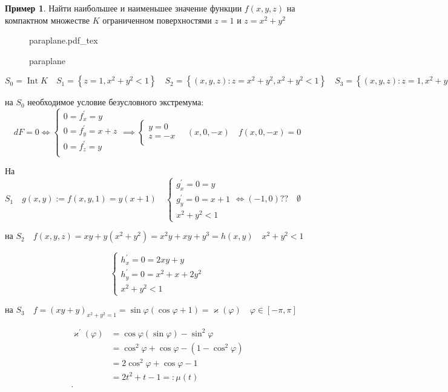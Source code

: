 \documentclass{book}
\renewcommand\O{\ensuremath{\emptyset}}
\newcommand{\p}[1]{#1^{\prime}}
\theoremstyle{definition}
\newtheorem*{example}{Пример}
\newcommand{\incfig}[1]{%
    \def\svgwidth{\columnwidth}
    {#1.pdf_tex}
}
\DeclareMathOperator{\Int}{Int}
\begin{document}
    \begin{example}
        Найти наибольшее и наименьшее значение функции $f(x,y,z)$ на компактном множестве $K$ ограниченном поверхностями  $z = 1$ и  $z = x^2+y^2$

\begin{figure}[!ht]
    \centering
    \incfig{paraplane}
    \caption{paraplane}
    \label{fig:paraplane}
\end{figure}

$S_0 = \Int K\quad S_1 = \left\{ z = 1, x^2+y^2<1 \right\} \quad S_2 = \left\{ \left( x, y, z \right) : z = x^2+y^2, x^2+y^2<1 \right\} \quad S_3 = \left\{ \left( x,y,z\right): z = 1, x^2+y^2=1  \right\} $ 

на $S_0$ необходимое условие безусловного экстремума: \[dF = 0 \iff  \begin{cases}
     0 = \p f_x = y\\
     0 = \p f_y = x+z\\
     0 = \p f_z = y\\
\end{cases} \implies   \begin{cases}
    y = 0\\
    z = -x\\
\end{cases}\quad \left( x,0,-x \right) \quad f\left( x,0,-x \right)  = 0\]

На $S_1\quad g(x,y):= f\left( x,y,1 \right)  = y(x+1)\quad  \begin{cases}
    \p g_x = 0 = y\\
    \p g_y = 0 = x+1\\
    x^2+y^2<1
\end{cases} \iff (-1,0)??\quad \O $

на $S_2\quad f(x,y,z) = xy + y\left( x^2+y^2 \right)  = x^2y+xy+y^3 = h(x,y)\quad x^2+y^2 <1$

\[\begin{cases}
    \p h_x  = 0 = 2xy+y\\
    \p h_y = 0 = x^2+x+2y^2\\
    x^2+y^2<1
\end{cases} \]

на $S_3\quad f = (xy+y)_{x^2+y^2=1} = \sin \varphi\left( \cos \varphi + 1 \right) = \varkappa(\varphi)\quad \varphi\in[-\pi, \pi ] $

\begin{align*}
    \p \varkappa(\varphi) &= \cos \varphi\left( \sin \varphi \right)  -\sin ^2\varphi\\
                          &= \cos ^2\varphi + \cos \varphi - \left( 1-\cos ^2\varphi \right)  \\
                          &= 2\cos ^2\varphi + \cos \varphi - 1  \\
                          &= 2t^2+t-1 =: \mu(t) \\
.\end{align*}


\end{example}
\end{document}

